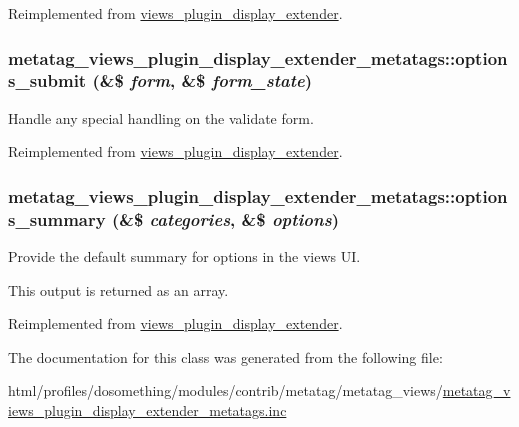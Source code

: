 Reimplemented from \hyperlink{classviews__plugin__display__extender_abbc782f6c6cdaa21db41379a7fbbb61c}{views\_\-plugin\_\-display\_\-extender}.\hypertarget{classmetatag__views__plugin__display__extender__metatags_a7485da0c4d0a0b1bab8e2df1fceca06b}{
\subsubsection[{options\_\-submit}]{\setlength{\rightskip}{0pt plus 5cm}metatag\_\-views\_\-plugin\_\-display\_\-extender\_\-metatags::options\_\-submit (\&\$ {\em form}, \/  \&\$ {\em form\_\-state})}}
\label{classmetatag__views__plugin__display__extender__metatags_a7485da0c4d0a0b1bab8e2df1fceca06b}
Handle any special handling on the validate form. 

Reimplemented from \hyperlink{classviews__plugin__display__extender_a30f3b8a5bd28012f09b9e5dbb4a2a083}{views\_\-plugin\_\-display\_\-extender}.\hypertarget{classmetatag__views__plugin__display__extender__metatags_a576b24d90f7f9d21a9409670afc10a6f}{
\subsubsection[{options\_\-summary}]{\setlength{\rightskip}{0pt plus 5cm}metatag\_\-views\_\-plugin\_\-display\_\-extender\_\-metatags::options\_\-summary (\&\$ {\em categories}, \/  \&\$ {\em options})}}
\label{classmetatag__views__plugin__display__extender__metatags_a576b24d90f7f9d21a9409670afc10a6f}
Provide the default summary for options in the views UI.

This output is returned as an array. 

Reimplemented from \hyperlink{classviews__plugin__display__extender_a7f95727e4d29fc9450bfcb38df8d7fa9}{views\_\-plugin\_\-display\_\-extender}.

The documentation for this class was generated from the following file:\begin{DoxyCompactItemize}
\item 
html/profiles/dosomething/modules/contrib/metatag/metatag\_\-views/\hyperlink{metatag__views__plugin__display__extender__metatags_8inc}{metatag\_\-views\_\-plugin\_\-display\_\-extender\_\-metatags.inc}\end{DoxyCompactItemize}

